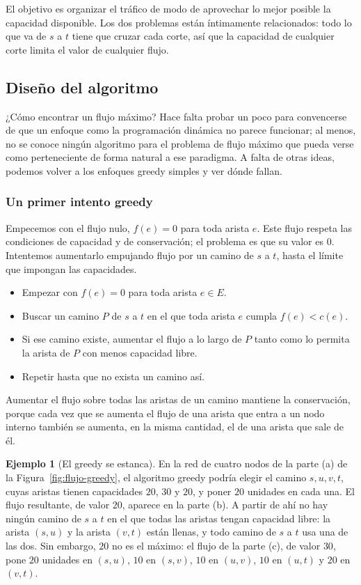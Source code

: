 \documentclass[12pt, spanish, oneside, openany]{book}
\theoremstyle{uprightplain}
\theoremstyle{definition}
\newtheorem{ejemplo}[teorema]{Ejemplo}
\theoremstyle{remark}
\theoremstyle{definition}
\begin{document}
El objetivo es organizar el tráfico de modo de aprovechar lo mejor posible la capacidad disponible. Los dos problemas están íntimamente relacionados: todo lo que va de $s$ a $t$ tiene que cruzar cada corte, así que la capacidad de cualquier corte limita el valor de cualquier flujo.

\subsection{Diseño del algoritmo}

¿Cómo encontrar un flujo máximo? Hace falta probar un poco para convencerse de que un enfoque como la programación dinámica no parece funcionar; al menos, no se conoce ningún algoritmo para el problema de flujo máximo que pueda verse como perteneciente de forma natural a ese paradigma. A falta de otras ideas, podemos volver a los enfoques greedy simples y ver dónde fallan.

\subsubsection{Un primer intento greedy}

Empecemos con el flujo nulo, $f(e)=0$ para toda arista $e$. Este flujo respeta las condiciones de capacidad y de conservación; el problema es que su valor es $0$. Intentemos aumentarlo empujando flujo por un camino de $s$ a $t$, hasta el límite que impongan las capacidades.

\begin{itemize}
    \item Empezar con $f(e)=0$ para toda arista $e\in E$.
    \item Buscar un camino $P$ de $s$ a $t$ en el que toda arista $e$ cumpla $f(e)<c(e)$.
    \item Si ese camino existe, aumentar el flujo a lo largo de $P$ tanto como lo permita la arista de $P$ con menos capacidad libre.
    \item Repetir hasta que no exista un camino así.
\end{itemize}

Aumentar el flujo sobre todas las aristas de un camino mantiene la conservación, porque cada vez que se aumenta el flujo de una arista que entra a un nodo interno también se aumenta, en la misma cantidad, el de una arista que sale de él.

\begin{ejemplo}[El greedy se estanca]
\label{ej:flujo-greedy-falla}
En la red de cuatro nodos de la parte (a) de la Figura~\ref{fig:flujo-greedy}, el algoritmo greedy podría elegir el camino $s,u,v,t$, cuyas aristas tienen capacidades $20$, $30$ y $20$, y poner $20$ unidades en cada una. El flujo resultante, de valor $20$, aparece en la parte (b). A partir de ahí no hay ningún camino de $s$ a $t$ en el que todas las aristas tengan capacidad libre: la arista $(s,u)$ y la arista $(v,t)$ están llenas, y todo camino de $s$ a $t$ usa una de las dos. Sin embargo, $20$ no es el máximo: el flujo de la parte (c), de valor $30$, pone $20$ unidades en $(s,u)$, $10$ en $(s,v)$, $10$ en $(u,v)$, $10$ en $(u,t)$ y $20$ en $(v,t)$.
\end{ejemplo}
\end{document}
